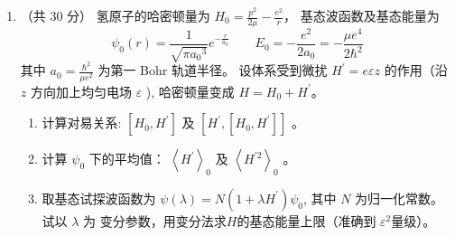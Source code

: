 \begin{enumerate}
{}
\item 
（共 30 分）
氢原子的哈密顿量为 $H_{0}=\frac{p^{2}}{2 \mu}-\frac{e^{2}}{r} $， 基态波函数及基态能量为
$$
\psi_{0}(r)=\frac{1}{\sqrt{\pi a_{0}{ }^{3}}} e^{-\frac{r}{a_{0}}} \qquad  E_{0}=-\frac{e^{2}}{2 a_{0}}=-\frac{\mu e^{4}}{2 \hbar^{2}}
$$
其中 $a_{0}=\frac{\hbar^{2}}{\mu e^{2}}$ 为第一 Bohr 轨道半径。
设体系受到微扰 $H^{\prime}=e \varepsilon z$ 的作用（沿 $z$ 方向加上均匀电场 $\varepsilon$ ), 哈密顿量变成 $H=H_{0}+H^{\prime}$。
\begin{enumerate}
	\item
	计算对易关系: $\left[H_{0}, H^{\prime}\right]$ 及 $\left[H^{\prime},\left[H_{0}, H^{\prime}\right]\right]$ 。
	\item 
	计算 $\psi_{0}$ 下的平均值： $\left\langle H^{\prime}\right\rangle_{0}$ 及 $\left\langle H^{\prime 2}\right\rangle_{0}$ 。
	\item 
	取基态试探波函数为 $\psi(\lambda)=N\left(1+\lambda H^{\prime}\right) \psi_{0}$, 其中 $N$ 为归一化常数。试以 $\lambda$ 为
	变分参数，用变分法求$  H  $的基态能量上限（准确到
$\varepsilon^{2}$量级）。
	
	
\end{enumerate}


\end{enumerate}
